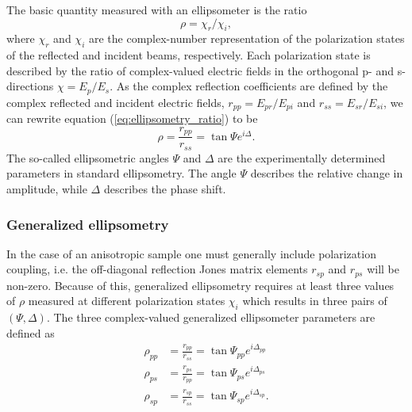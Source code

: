 The basic quantity measured with an ellipsometer is the ratio 
\begin{equation}
    \rho = \chi_r/\chi_i,
    \label{eq:ellipsometry_ratio}
\end{equation}
where $\chi_r$ and $\chi_i$ are the complex-number representation of the polarization states of the reflected and incident beams, respectively. Each polarization state is described by the ratio of complex-valued electric fields in the orthogonal p- and s-directions $\chi = E_p/E_s$. As the complex reflection coefficients are defined by the complex reflected and incident electric fields, $r_{pp}=E_{pr}/E_{pi}$ and $r_{ss}=E_{sr}/E_{si}$, we can rewrite equation (\ref{eq:ellipsometry_ratio}) to be
\begin{equation}
    \rho = \frac{r_{pp}}{r_{ss}} = \tan\Psi e^{i\Delta}.
    \label{eq:standard_ellipsometry}
\end{equation}
The so-called ellipsometric angles $\Psi$ and $\Delta$ are the experimentally determined parameters in standard ellipsometry. The angle $\Psi$ describes the relative change in amplitude, while $\Delta$ describes the phase shift.
 
\subsubsection{Generalized ellipsometry}
In the case of an anisotropic sample one must generally include polarization coupling, i.e. the off-diagonal reflection Jones matrix elements $r_{sp}$ and $r_{ps}$ will be non-zero. Because of this, generalized ellipsometry requires at least three values of $\rho$ measured at different polarization states $\chi_i$ which results in three pairs of $(\Psi, \Delta)$. The three complex-valued generalized ellipsometer parameters are defined as
\begin{subequations}
\begin{align}
    \rho_{pp} &= \frac{r_{pp}}{r_{ss}} = \tan \Psi_{pp} e^{i\Delta_{pp}} \\
    \rho_{ps} &= \frac{r_{ps}}{r_{pp}} = \tan \Psi_{ps} e^{i\Delta_{ps}} \\
    \rho_{sp} &= \frac{r_{sp}}{r_{ss}} = \tan \Psi_{sp} e^{i\Delta_{sp}}.
\end{align}
    \label{eq:generalized_ellipsometer_angles}
\end{subequations}

